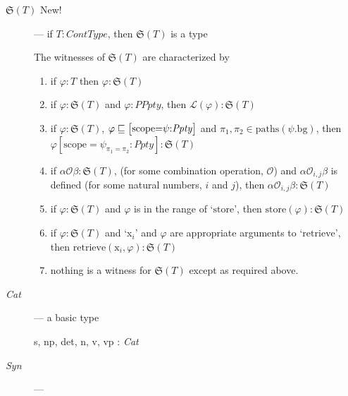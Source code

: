\begin{description}
\begin{description}
\end{description}

\item[\textnormal{$\mathfrak{S}(T)$} New!] --- if
  $T:\textit{ContType}$, then $\mathfrak{S}(T)$ is a type

  The witnesses of $\mathfrak{S}(T)$ are characterized by
  \begin{enumerate} 
 
  \item if $\varphi:T$ then $\varphi:\mathfrak{S}(T)$
    
  \item if $\varphi:\mathfrak{S}(T)$ and $\varphi:\textit{PPpty}$,
    then $\mathcal{L}(\varphi):\mathfrak{S}(T)$

    
  \item if $\varphi:\mathfrak{S}(T)$,
    $\varphi\sqsubseteq\text{\smallrecord{
        \smallmfield{scope}{$\psi$}{\textit{Ppty}}}}$ and
    $\pi_1,\pi_2\in\mathrm{paths}(\psi.\text{bg})$, then $\varphi[\text{scope}=\psi_{\pi_1=\pi_2}:\textit{Ppty}]:\mathfrak{S}(T)$

  \item if $\alpha\mathcal{O}\beta:\mathfrak{S}(T)$, (for
      some combination operation, $\mathcal{O}$) and
      $\alpha\mathcal{O}_{i,j}\beta$ is defined (for some natural
      numbers, $i$ and $j$), then $\alpha\mathcal{O}_{i,j}\beta:\mathfrak{S}(T)$
 
  \item if $\varphi:\mathfrak{S}(T)$ and $\varphi$ is in the range of `$\mathrm{store}$', then
    $\mathrm{store}(\varphi):\mathfrak{S}(T)$

  \item if $\varphi:\mathfrak{S}(T)$ and `x$_i$' and $\varphi$ are appropriate
    arguments to `$\mathrm{retrieve}$', then
    $\mathrm{retrieve}(\text{x}_i,\varphi):\mathfrak{S}(T)$
    
  \item nothing is a witness for $\mathfrak{S}(T)$ except as required above.
 
  \end{enumerate}

  
  

      
    \item[\textnormal{\textit{Cat}}] --- a basic type

      s, np, det, n, v, vp : \textit{Cat}

    
    \item[\textnormal{\textit{Syn}}] ---   
 



\end{description}
